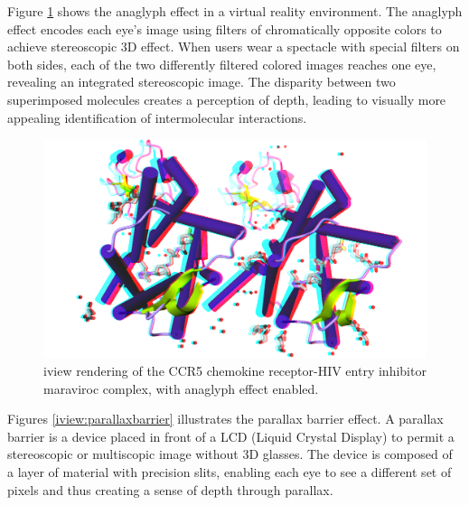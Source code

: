 Figure \ref{iview:anaglyph} shows the anaglyph effect in a virtual reality environment. The anaglyph effect encodes each eye's image using filters of chromatically opposite colors to achieve stereoscopic 3D effect. When users wear a spectacle with special filters on both sides, each of the two differently filtered colored images reaches one eye, revealing an integrated stereoscopic image. The disparity between two superimposed molecules creates a perception of depth, leading to visually more appealing identification of intermolecular interactions.
 
\begin{figure}
\begin{center}
\includegraphics[width=\linewidth]{../iview/anaglyph.png}
\end{center}
\caption{iview rendering of the CCR5 chemokine receptor-HIV entry inhibitor maraviroc complex, with anaglyph effect enabled.}
\label{iview:anaglyph}
\end{figure}

Figures \ref{iview:parallaxbarrier} illustrates the parallax barrier effect. A parallax barrier is a device placed in front of a LCD (Liquid Crystal Display) to permit a stereoscopic or multiscopic image without 3D glasses. The device is composed of a layer of material with precision slits, enabling each eye to see a different set of pixels and thus creating a sense of depth through parallax.

